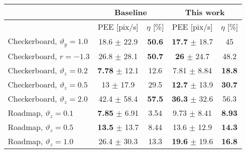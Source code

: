 \begin{tabular}{l|cc|cc}
\hline
~ & \multicolumn{2}{c|}{Baseline \cite{Benosman2014}} & \multicolumn{2}{c}{This work} \\ \hline
~ & PEE [pix/s] & $\eta$ [\%] & PEE [pix/s] & $\eta$ [\%] \\ \hline
Checkerboard, $\vartheta_y=1.0$ & 18.6 $\pm$ 22.9 & \textbf{50.6} & \textbf{17.7} $\pm$ 18.7 & 45 \\
Checkerboard, $r=-1.3$ & 26.8 $\pm$ 28.1 & \textbf{50.7} & \textbf{26} $\pm$ 24.7 & 48.2 \\
Checkerboard, $\vartheta_z=0.2$ & \textbf{7.78} $\pm$ 12.1 & 12.6 & 7.81 $\pm$ 8.84 & \textbf{18.8} \\
Checkerboard, $\vartheta_z=0.5$ & 13 $\pm$ 17.9 & 29.5 & \textbf{12.7} $\pm$ 13.9 & \textbf{30.7} \\
Checkerboard, $\vartheta_z=2.0$ & 42.4 $\pm$ 58.4 & \textbf{57.5} & \textbf{36.3} $\pm$ 32.6 & 56.3 \\
Roadmap, $\vartheta_z=0.1$ & \textbf{7.85} $\pm$ 6.91 & 3.54 & 9.73 $\pm$ 8.41 & \textbf{8.93} \\
Roadmap, $\vartheta_z=0.5$ & \textbf{13.5} $\pm$ 13.7 & 8.44 & 13.6 $\pm$ 12.9 & \textbf{14.3} \\
Roadmap, $\vartheta_z=1.0$ & 26.4 $\pm$ 30.3 & 13.3 & \textbf{19.6} $\pm$ 19.6 & \textbf{16.8} \\ \hline

\end{tabular}
